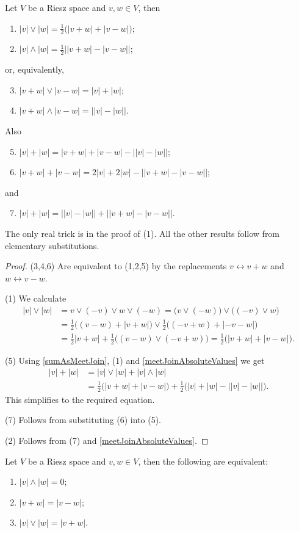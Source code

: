 \begin{proposition}
Let $V$ be a Riesz space and $v,w\in V$, then
\begin{enumerate}
\item $|v|\vee |w| = \frac{1}{2}\Big( |v+w| + |v - w| \Big)$;
\item $|v|\wedge |w| = \frac{1}{2}\Big| |v+w| - |v - w| \Big|$;
\end{enumerate}
or, equivalently,
\begin{enumerate} \setcounter{enumi}{2}
\item $|v+w|\vee |v-w| = |v| + |w|$;
\item $|v+w|\wedge |v-w| = \big| |v| - |w| \big|$.
\end{enumerate}
Also
\begin{enumerate} \setcounter{enumi}{4}
\item $|v|+|w| = |v+w| + |v-w| - \big||v|-|w|\big|$;
\item $|v+w|+|v-w| = 2|v| + 2|w| - \big||v+w|-|v-w|\big|$;
\end{enumerate}
and
\begin{enumerate} \setcounter{enumi}{6}
\item $|v|+|w| = \big||v|-|w|\big| + \big||v+w|-|v-w|\big|$.
\end{enumerate}
\end{proposition}
The only real trick is in the proof of (1). All the other results follow from elementary substitutions.
\begin{proof}
(3,4,6) Are equivalent to (1,2,5) by the replacements $v \leftrightarrow v+w$ and $w \leftrightarrow v-w$.

(1) We calculate
\begin{align*}
|v|\vee |w| &= v\vee (-v)\vee w \vee (-w) = \big(v\vee(-w)\big)\vee \big((-v)\vee w\big) \\
&= \frac{1}{2}\Big((v-w) + |v + w|\Big)\vee \frac{1}{2}\Big( (-v+w) + |- v - w| \Big) \\
&= \frac{1}{2}|v+ w| + \frac{1}{2}\big((v-w)\vee (-v+w)\big) = \frac{1}{2}\Big( |v+w| + |v - w| \Big).
\end{align*}

(5) Using \ref{sumAsMeetJoin}, (1) and \ref{meetJoinAbsoluteValues} we get
\begin{align*}
|v|+|w| &= |v|\vee|w| + |v|\wedge |w| \\
&= \frac{1}{2}\Big( |v+w| + |v - w| \Big) + \frac{1}{2}\Big(|v|+|w| - \big||v| - |w|\big|\Big).
\end{align*}
This simplifies to the required equation.

(7) Follows from substituting (6) into (5).

(2) Follows from (7) and \ref{meetJoinAbsoluteValues}.
\end{proof}
\begin{corollary}
Let $V$ be a Riesz space and $v,w\in V$, then the following are equivalent:
\begin{enumerate}
\item $|v|\wedge |w| = 0$;
\item $|v+w| = |v-w|$;
\item $|v|\vee |w| = |v+w|$.
\end{enumerate}
\end{corollary}

